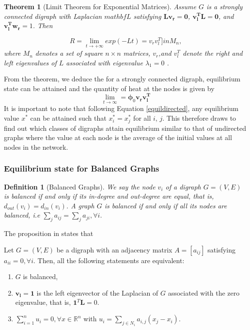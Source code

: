 \documentclass[10pt,a4paper]{article}
\newtheorem{thm}{Theorem}
\newtheorem{defn}{Definition}
\begin{document}
        \begin{thm}[Limit Theorem for Exponential Matrices]
        	Assume $G$ is a strongly connected digraph with Laplacian $mathbf{L}$ satisfying $\mathbf{L} \mathbf{v_r} = \mathbf{0}$, $\mathbf{v_{l} ^T} \mathbf{L} =\mathbf{0}$, and $\mathbf{v_{l} ^T} \mathbf{w_r}=1$. Then 
        	
        	\begin{equation}
        	 R = \lim_{t \longrightarrow +\infty} exp(-Lt) = v_r  v_{l} ^T ]in M_n,
        	\end{equation}
        	where $M_n$ denotes a set of square $n\times n$ matrices, $v_r$,and $v_{l} ^T$ denote the right and left eigenvalues of $L$ associated with eigenvalue $\lambda_1 = 0$ \citep{saber2003agreement}.
        \end{thm}
    From the theorem, we deduce the for a strongly connected digraph, equilibrium state can be attained and the quantity of heat at the nodes is given by
    \begin{equation}
    \lim_{t \longrightarrow \infty} =  \boldsymbol{\phi}_0  \mathbf{v_r}  \mathbf{v_{l} ^T}
    \label{equildirected}
    \end{equation}
    It is important to note that following Equation \ref{equildirected}, any equilibrium value $x^*$ can be attained such that $x^*_i =x^*_j$ for all $i$, $j$. This therefore draws to find out which classes of digraphs attain equilibrium similar to that of undirected graphs where the value at each node is the average of the initial values at all nodes in the network.
    \subsubsection{Equilibrium state for Balanced Graphs}
    \begin{defn}[Balanced Graphs]
    	We say the node $v_i$ of a digraph $G=(V,E)$ is balanced if and only if its in-degree and out-degree are equal, that is, $d_{out}(v_i) =d_{in}(v_i)$. A graph $G$ is balanced if and only if all its nodes are balanced, i.e $\sum_j a_{ij} = \sum_j a_{ji}, \forall i$. 
    \end{defn}
     The proposition in \citep{saber2003agreement} states that 
     
     Let $G=(V,E)$ be a digraph with an adjacency matrix $A=[a_{ij}]$ satisfying $a_{ii}=0, \forall i$. Then, all the following statements are equivalent:
     \begin{enumerate}
     	\item $G$ is balanced,
     	\item $\mathbf{v_l}= \mathbf{1}$ is the left eigenvector of the Laplacian of $G$ associated with the zero eigenvalue, that is, $\mathbf{1}^T \mathbf{L} = 0$.
     	\item $\sum_{i=1} ^ n u_i = 0, \forall x \in  \mathbb{R}^n$ with $u_i = \sum_{j \in N_i} a_{i,j} (x_j -x_i).$
     \end{enumerate}
    
\end{document}
